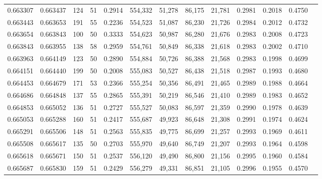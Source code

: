 \begin{tabular}{rrrrrrrrrrrrr}
0.663307 & 0.663437 &   124 &  51 &                                     0.2914 & 554,332 &  51,278 &  86,175 &  21,781 & 0.2981 & 0.2018 & 0.4750 \\
0.663443 & 0.663653 &   191 &  55 &                                     0.2236 & 554,523 &  51,087 &  86,230 &  21,726 & 0.2984 & 0.2012 & 0.4732 \\
0.663654 & 0.663843 &   100 &  50 &                                     0.3333 & 554,623 &  50,987 &  86,280 &  21,676 & 0.2983 & 0.2008 & 0.4723 \\
0.663843 & 0.663955 &   138 &  58 &                                     0.2959 & 554,761 &  50,849 &  86,338 &  21,618 & 0.2983 & 0.2002 & 0.4710 \\
0.663963 & 0.664149 &   123 &  50 &                                     0.2890 & 554,884 &  50,726 &  86,388 &  21,568 & 0.2983 & 0.1998 & 0.4699 \\
0.664151 & 0.664440 &   199 &  50 &                                     0.2008 & 555,083 &  50,527 &  86,438 &  21,518 & 0.2987 & 0.1993 & 0.4680 \\
0.664453 & 0.664679 &   171 &  53 &                                     0.2366 & 555,254 &  50,356 &  86,491 &  21,465 & 0.2989 & 0.1988 & 0.4664 \\
0.664686 & 0.664848 &   137 &  55 &                                     0.2865 & 555,391 &  50,219 &  86,546 &  21,410 & 0.2989 & 0.1983 & 0.4652 \\
0.664853 & 0.665052 &   136 &  51 &                                     0.2727 & 555,527 &  50,083 &  86,597 &  21,359 & 0.2990 & 0.1978 & 0.4639 \\
0.665053 & 0.665288 &   160 &  51 &                                     0.2417 & 555,687 &  49,923 &  86,648 &  21,308 & 0.2991 & 0.1974 & 0.4624 \\
0.665291 & 0.665506 &   148 &  51 &                                     0.2563 & 555,835 &  49,775 &  86,699 &  21,257 & 0.2993 & 0.1969 & 0.4611 \\
0.665508 & 0.665617 &   135 &  50 &                                     0.2703 & 555,970 &  49,640 &  86,749 &  21,207 & 0.2993 & 0.1964 & 0.4598 \\
0.665618 & 0.665671 &   150 &  51 &                                     0.2537 & 556,120 &  49,490 &  86,800 &  21,156 & 0.2995 & 0.1960 & 0.4584 \\
0.665687 & 0.665830 &   159 &  51 &                                     0.2429 & 556,279 &  49,331 &  86,851 &  21,105 & 0.2996 & 0.1955 & 0.4570 \\

\end{tabular}
